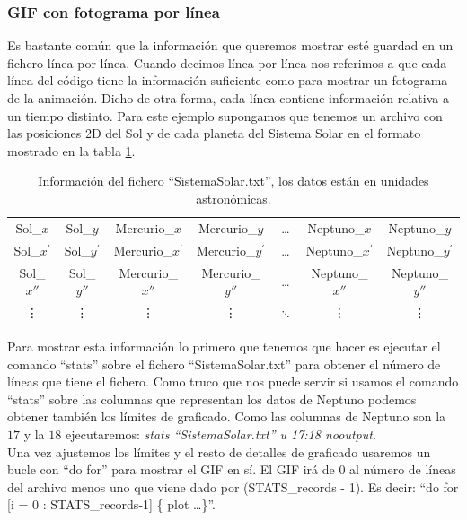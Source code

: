 \documentclass[11pt,a4paper,twoside,pdf]{article}
\numberwithin{equation}{section}
\begin{document}
\subsubsection{GIF con fotograma por línea}

Es bastante común que la información que queremos mostrar esté guardad en un fichero línea por línea. Cuando decimos línea por línea nos referimos a que cada línea del código tiene la información suficiente como para mostrar un fotograma de la animación. Dicho de otra forma, cada línea contiene información relativa a un tiempo distinto. Para este ejemplo supongamos que tenemos un archivo con las posiciones 2D del Sol y de cada planeta del Sistema Solar en el formato mostrado en la tabla \ref{tab:FicheroSistSolar}.

\begin{table}[h]
	\centering
	\footnotesize
	\caption{Información del fichero ``SistemaSolar.txt'', los datos están en unidades astronómicas.}
	\vspace{10pt}
	\label{tab:FicheroSistSolar}
	\begin{tabular}{ccccccc}
	Sol\_$x$ & Sol\_$y$ & Mercurio\_$x$ & Mercurio\_$y$ & \ldots & Neptuno\_$x$ & Neptuno\_$y$ \\
	Sol\_$x^{\prime}$ & Sol\_$y^{\prime}$ & Mercurio\_$x^{\prime}$ & Mercurio\_$y^{\prime}$ & \ldots & Neptuno\_$x^{\prime}$ & Neptuno\_$y^{\prime}$ \\
	Sol\_$x''$ & Sol\_$y''$ & Mercurio\_$x''$ & Mercurio\_$y''$ & \ldots & Neptuno\_$x''$ & Neptuno\_$y''$ \\
	\vdots & \vdots & \vdots & \vdots & $\ddots$ & \vdots & \vdots \\
	\end{tabular}
\end{table}

Para mostrar esta información lo primero que tenemos que hacer es ejecutar el comando ``stats'' sobre el fichero ``SistemaSolar.txt'' para obtener el número de líneas que tiene el fichero. Como truco que nos puede servir si usamos el comando ``stats'' sobre las columnas que representan los datos de Neptuno podemos obtener también los límites de graficado. Como las columnas de Neptuno son la $17$ y la $18$ ejecutaremos: \textit{stats ``SistemaSolar.txt'' u 17:18 nooutput}. \\

Una vez ajustemos los límites y el resto de detalles de graficado usaremos un bucle con ``do for'' para mostrar el GIF en sí. El GIF irá de $0$ al número de líneas del archivo menos uno que viene dado por (STATS\_records - 1). Es decir: ``do for [i = 0 : STATS\_records-1] \{ plot \ldots \}''. \\
\end{document}
